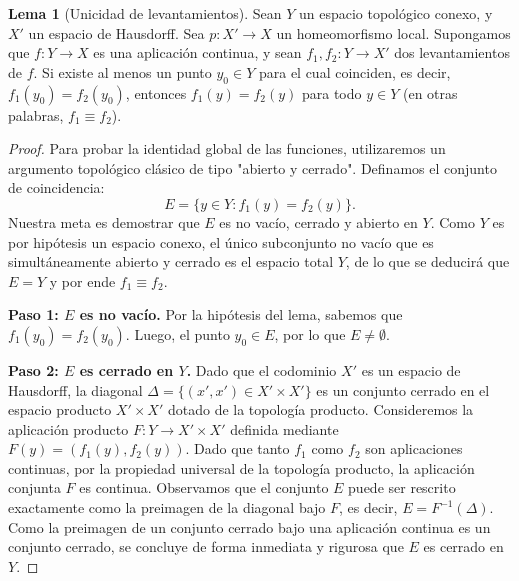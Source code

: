 \documentclass[11pt,a4paper]{article}
\theoremstyle{definition}
\newtheorem{lema}{Lema}[section]
\theoremstyle{remark}
\numberwithin{equation}{section}
\begin{document}
\begin{lema}[Unicidad de levantamientos]
Sean $Y$ un espacio topológico conexo, y $X'$ un espacio de Hausdorff. Sea $p: X' \to X$ un homeomorfismo local. Supongamos que $f: Y \to X$ es una aplicación continua, y sean $f_1, f_2: Y \to X'$ dos levantamientos de $f$. Si existe al menos un punto $y_0 \in Y$ para el cual coinciden, es decir, $f_1(y_0) = f_2(y_0)$, entonces $f_1(y) = f_2(y)$ para todo $y \in Y$ (en otras palabras, $f_1 \equiv f_2$).
\end{lema}
\begin{proof}
Para probar la identidad global de las funciones, utilizaremos un argumento topológico clásico de tipo "abierto y cerrado". Definamos el conjunto de coincidencia:
\begin{equation}
E = \{ y \in Y : f_1(y) = f_2(y) \}.
\end{equation}
Nuestra meta es demostrar que $E$ es no vacío, cerrado y abierto en $Y$. Como $Y$ es por hipótesis un espacio conexo, el único subconjunto no vacío que es simultáneamente abierto y cerrado es el espacio total $Y$, de lo que se deducirá que $E = Y$ y por ende $f_1 \equiv f_2$.

\textbf{Paso 1: $E$ es no vacío.}
Por la hipótesis del lema, sabemos que $f_1(y_0) = f_2(y_0)$. Luego, el punto $y_0 \in E$, por lo que $E \neq \emptyset$.

\textbf{Paso 2: $E$ es cerrado en $Y$.}
Dado que el codominio $X'$ es un espacio de Hausdorff, la diagonal $\Delta = \{ (x', x') \in X' \times X' \}$ es un conjunto cerrado en el espacio producto $X' \times X'$ dotado de la topología producto. Consideremos la aplicación producto $F: Y \to X' \times X'$ definida mediante $F(y) = (f_1(y), f_2(y))$. Dado que tanto $f_1$ como $f_2$ son aplicaciones continuas, por la propiedad universal de la topología producto, la aplicación conjunta $F$ es continua. Observamos que el conjunto $E$ puede ser rescrito exactamente como la preimagen de la diagonal bajo $F$, es decir, $E = F^{-1}(\Delta)$. Como la preimagen de un conjunto cerrado bajo una aplicación continua es un conjunto cerrado, se concluye de forma inmediata y rigurosa que $E$ es cerrado en $Y$.


\end{proof}
\end{document}
